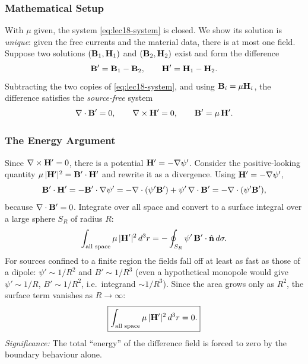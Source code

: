 \subsubsection*{Mathematical Setup}
With $\mu$ given, the system \eqref{eq:lec18-system} is closed. We show its solution is
\emph{unique}: given the free currents and the material data, there is at most one field.
Suppose two solutions $(\mathbf{B}_1,\mathbf{H}_1)$ and $(\mathbf{B}_2,\mathbf{H}_2)$ exist and form the
difference
\begin{equation}\label{eq:lec18-diff}
  \mathbf{B}'=\mathbf{B}_1-\mathbf{B}_2,\qquad \mathbf{H}'=\mathbf{H}_1-\mathbf{H}_2.
\end{equation}
Subtracting the two copies of \eqref{eq:lec18-system}, and using
$\mathbf{B}_i=\mu\mathbf{H}_i$, the difference satisfies the \emph{source-free} system
\begin{equation}\label{eq:lec18-diff-system}
  \nabla \cdot\mathbf{B}'=0,\qquad \nabla\times\mathbf{H}'=0,\qquad \mathbf{B}'=\mu\,\mathbf{H}'.
\end{equation}

\subsubsection*{The Energy Argument}
Since $\nabla\times\mathbf{H}'=0$, there is a potential $\mathbf{H}'=-\nabla \psi'$. Consider the
positive-looking quantity $\mu\,|\mathbf{H}'|^2=\mathbf{B}'\cdot\mathbf{H}'$ and rewrite it as a
divergence. Using $\mathbf{H}'=-\nabla \psi'$,
\begin{equation}\label{eq:lec18-BdotH}
  \mathbf{B}'\cdot\mathbf{H}'=-\mathbf{B}'\cdot\nabla \psi'
  =-\nabla \cdot(\psi'\mathbf{B}')+\psi'\,\nabla \cdot\mathbf{B}'
  =-\nabla \cdot(\psi'\mathbf{B}'),
\end{equation}
because $\nabla \cdot\mathbf{B}'=0$. Integrate over all space and convert to a surface integral over a
large sphere $S_R$ of radius $R$:
\begin{equation}\label{eq:lec18-integral}
  \int_{\text{all space}}\mu\,|\mathbf{H}'|^2\,d^3r
  =-\oint_{S_R}\psi'\,\mathbf{B}'\cdot\hat{\mathbf{n}}\,d\sigma.
\end{equation}
For sources confined to a finite region the fields fall off at least as fast as those of
a dipole: $\psi'\sim 1/R^2$ and $B'\sim1/R^3$ (even a hypothetical monopole would give
$\psi'\sim1/R$, $B'\sim1/R^2$, i.e.\ integrand $\sim1/R^3$). Since the area grows only as
$R^2$, the surface term vanishes as $R\to\infty$:
\begin{equation}\label{eq:lec18-zero}
  \boxed{\int_{\text{all space}}\mu\,|\mathbf{H}'|^2\,d^3r=0.}
\end{equation}
\textit{Significance:} The total ``energy'' of the difference field is forced to zero by
the boundary behaviour alone.

